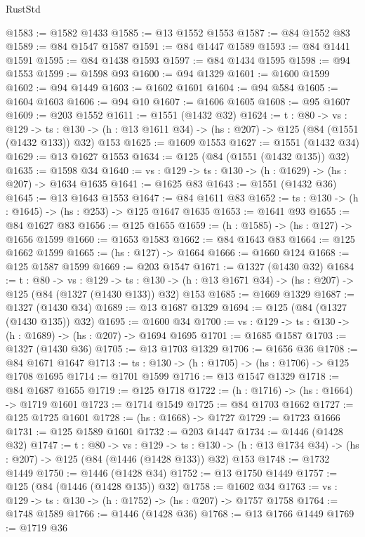 \begin{lexlean}{RustStd}
\begin{coremodule}
{\begin{coremodule}
{{{{{{{{{{{{{{{@1583 := @1582 @1433
@1585 := @13 @1552 @1553
@1587 := @84 @1552 @83
@1589 := @84 @1547 @1587
@1591 := @84 @1447 @1589
@1593 := @84 @1441 @1591
@1595 := @84 @1438 @1593
@1597 := @84 @1434 @1595
@1598 := @94 @1553
@1599 := @1598 @93
@1600 := @94 @1329
@1601 := @1600 @1599
@1602 := @94 @1449
@1603 := @1602 @1601
@1604 := @94 @584
@1605 := @1604 @1603
@1606 := @94 @10
@1607 := @1606 @1605
@1608 := @95 @1607
@1609 := @203 @1552
@1611 := @1551 (@1432 @32)
@1624 := {t : @80} ->
  {vs : @129} ->
  {ts : @130} -> (h : @13 @1611 @34) -> (hs : @207) -> @125 (@84 (@1551 (@1432 @133)) @32) @153
@1625 := @1609 @1553
@1627 := @1551 (@1432 @34)
@1629 := @13 @1627 @1553
@1634 := @125 (@84 (@1551 (@1432 @135)) @32)
@1635 := @1598 @34
@1640 := {vs : @129} -> {ts : @130} -> (h : @1629) -> (hs : @207) -> @1634 @1635
@1641 := @1625 @83
@1643 := @1551 (@1432 @36)
@1645 := @13 @1643 @1553
@1647 := @84 @1611 @83
@1652 := {ts : @130} -> (h : @1645) -> (hs : @253) -> @125 @1647 @1635
@1653 := @1641 @93
@1655 := @84 @1627 @83
@1656 := @125 @1655
@1659 := (h : @1585) -> (hs : @127) -> @1656 @1599
@1660 := @1653 @1583
@1662 := @84 @1643 @83
@1664 := @125 @1662 @1599
@1665 := (hs : @127) -> @1664
@1666 := @1660 @124
@1668 := @125 @1587 @1599
@1669 := @203 @1547
@1671 := @1327 (@1430 @32)
@1684 := {t : @80} ->
  {vs : @129} ->
  {ts : @130} -> (h : @13 @1671 @34) -> (hs : @207) -> @125 (@84 (@1327 (@1430 @133)) @32) @153
@1685 := @1669 @1329
@1687 := @1327 (@1430 @34)
@1689 := @13 @1687 @1329
@1694 := @125 (@84 (@1327 (@1430 @135)) @32)
@1695 := @1600 @34
@1700 := {vs : @129} -> {ts : @130} -> (h : @1689) -> (hs : @207) -> @1694 @1695
@1701 := @1685 @1587
@1703 := @1327 (@1430 @36)
@1705 := @13 @1703 @1329
@1706 := @1656 @36
@1708 := @84 @1671 @1647
@1713 := {ts : @130} -> (h : @1705) -> (hs : @1706) -> @125 @1708 @1695
@1714 := @1701 @1599
@1716 := @13 @1547 @1329
@1718 := @84 @1687 @1655
@1719 := @125 @1718
@1722 := (h : @1716) -> (hs : @1664) -> @1719 @1601
@1723 := @1714 @1549
@1725 := @84 @1703 @1662
@1727 := @125 @1725 @1601
@1728 := (hs : @1668) -> @1727
@1729 := @1723 @1666
@1731 := @125 @1589 @1601
@1732 := @203 @1447
@1734 := @1446 (@1428 @32)
@1747 := {t : @80} ->
  {vs : @129} ->
  {ts : @130} -> (h : @13 @1734 @34) -> (hs : @207) -> @125 (@84 (@1446 (@1428 @133)) @32) @153
@1748 := @1732 @1449
@1750 := @1446 (@1428 @34)
@1752 := @13 @1750 @1449
@1757 := @125 (@84 (@1446 (@1428 @135)) @32)
@1758 := @1602 @34
@1763 := {vs : @129} -> {ts : @130} -> (h : @1752) -> (hs : @207) -> @1757 @1758
@1764 := @1748 @1589
@1766 := @1446 (@1428 @36)
@1768 := @13 @1766 @1449
@1769 := @1719 @36
}}}}}}}}}}}}}}}
\end{coremodule}}
\end{coremodule}
\end{lexlean}
